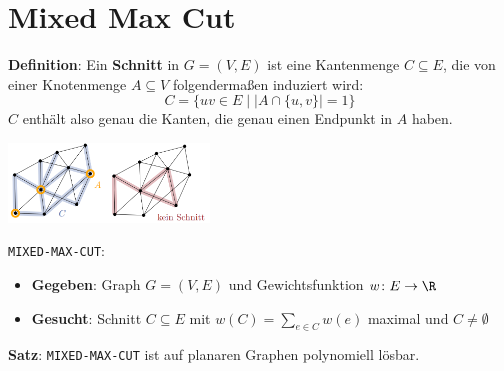 \section{Mixed Max Cut}

\textbf{Definition}: Ein \textbf{Schnitt} in $G=(V,E)$ ist eine Kantenmenge $C\subseteq E$, die von einer Knotenmenge $A\subseteq V$ folgendermaßen induziert wird:
$$C=\{uv\in E\mid |A\cap\{u,v\}|=1\}$$
$C$ enthält also genau die Kanten, die genau einen Endpunkt in $A$ haben.\\

\begin{center}
	\includegraphics[width=0.4\textwidth]{images/cut.png}
\end{center}
\pagebreak

\texttt{MIXED-MAX-CUT}: 
\begin{itemize}
	\item \textbf{Gegeben}: Graph $G=(V,E)$ und Gewichtsfunktion $w\colon E\rightarrow\R$
	\item \textbf{Gesucht}: Schnitt $C\subseteq E$ mit $w(C)=\sum\limits_{e\in C} w(e)$ maximal und $C\neq\emptyset$
\end{itemize}
\bigskip
\textbf{Satz}: \texttt{MIXED-MAX-CUT} ist auf planaren Graphen polynomiell lösbar.

